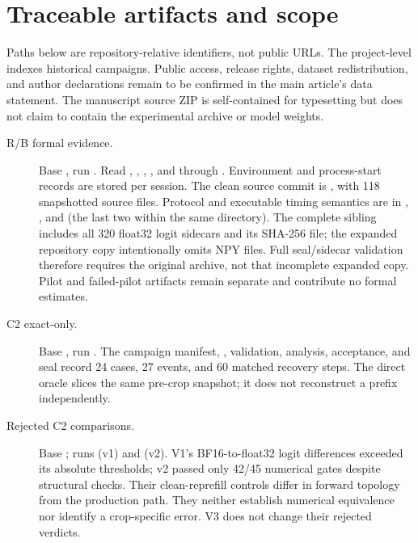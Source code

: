 \documentclass[12pt]{article}
\begin{document}
\section{Traceable artifacts and scope}
\label{sec:s-artifacts}

Paths below are repository-relative identifiers, not public URLs. The project-level  indexes historical campaigns. Public access, release rights, dataset redistribution, and author declarations remain to be confirmed in the main article's data statement. The manuscript source ZIP is self-contained for typesetting but does not claim to contain the experimental archive or model weights.

\begin{description}
\item[R/B formal evidence.] Base , run . Read , , , , and  through . Environment and process-start records are stored per session. The clean source commit is , with 118 snapshotted source files. Protocol and executable timing semantics are in , , and  (the last two within the same directory). The complete sibling  includes all 320 float32 logit sidecars and its SHA-256 file; the expanded repository copy intentionally omits NPY files. Full seal/sidecar validation therefore requires the original archive, not that incomplete expanded copy. Pilot and failed-pilot artifacts remain separate and contribute no formal estimates.
\item[C2 exact-only.] Base , run . The campaign manifest, , validation, analysis, acceptance, and seal record 24 cases, 27 events, and 60 matched recovery steps. The direct oracle slices the same pre-crop snapshot; it does not reconstruct a prefix independently.
\par{}
\item[Rejected C2 comparisons.] Base ; runs  (v1) and  (v2). V1's BF16-to-float32 logit differences exceeded its absolute thresholds; v2 passed only 42/45 numerical gates despite structural checks. Their clean-reprefill controls differ in forward topology from the production path. They neither establish numerical equivalence nor identify a crop-specific error. V3 does not change their rejected verdicts.

\end{description}
\end{document}
